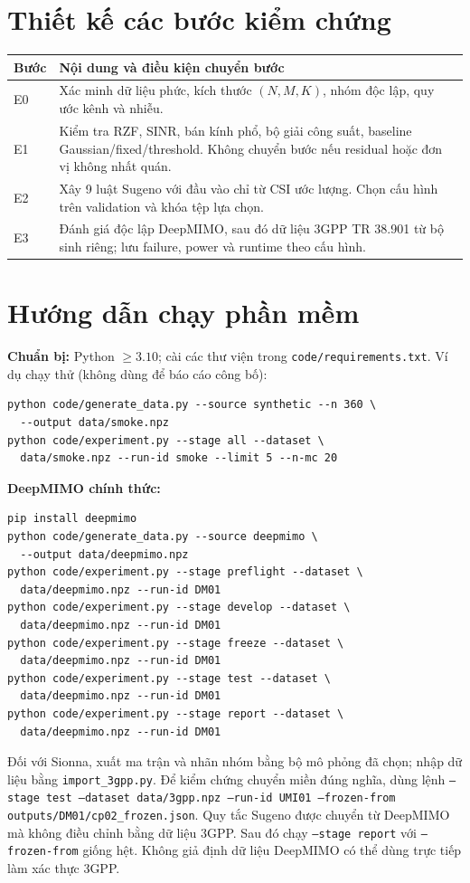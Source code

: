 \documentclass[11pt,onecolumn]{IEEEtran}
\begin{document}
\section{Thiết kế các bước kiểm chứng}
\begin{tabular}{p{.12\linewidth}p{.79\linewidth}}\toprule
Bước & Nội dung và điều kiện chuyển bước\\\midrule
E0 & Xác minh dữ liệu phức, kích thước $(N,M,K)$, nhóm độc lập, quy ước kênh và nhiễu.\\
E1 & Kiểm tra RZF, SINR, bán kính phổ, bộ giải công suất, baseline Gaussian/fixed/threshold. Không chuyển bước nếu residual hoặc đơn vị không nhất quán.\\
E2 & Xây 9 luật Sugeno với đầu vào chỉ từ CSI ước lượng. Chọn cấu hình trên validation và khóa tệp lựa chọn.\\
E3 & Đánh giá độc lập DeepMIMO, sau đó dữ liệu 3GPP TR 38.901 từ bộ sinh riêng; lưu failure, power và runtime theo cấu hình.\\\bottomrule\end{tabular}
\section{Hướng dẫn chạy phần mềm}
\textbf{Chuẩn bị:} Python $\geq3.10$; cài các thư viện trong \texttt{code/requirements.txt}. Ví dụ chạy thử (không dùng để báo cáo công bố):
\begin{verbatim}
python code/generate_data.py --source synthetic --n 360 \
  --output data/smoke.npz
python code/experiment.py --stage all --dataset \
  data/smoke.npz --run-id smoke --limit 5 --n-mc 20
\end{verbatim}
\textbf{DeepMIMO chính thức:}
\begin{verbatim}
pip install deepmimo
python code/generate_data.py --source deepmimo \
  --output data/deepmimo.npz
python code/experiment.py --stage preflight --dataset \
  data/deepmimo.npz --run-id DM01
python code/experiment.py --stage develop --dataset \
  data/deepmimo.npz --run-id DM01
python code/experiment.py --stage freeze --dataset \
  data/deepmimo.npz --run-id DM01
python code/experiment.py --stage test --dataset \
  data/deepmimo.npz --run-id DM01
python code/experiment.py --stage report --dataset \
  data/deepmimo.npz --run-id DM01
\end{verbatim}
Đối với Sionna, xuất ma trận và nhãn nhóm bằng bộ mô phỏng đã chọn; nhập dữ liệu bằng \texttt{import\_3gpp.py}. Để kiểm chứng chuyển miền đúng nghĩa, dùng lệnh \texttt{--stage test --dataset data/3gpp.npz --run-id UMI01 --frozen-from outputs/DM01/cp02\_frozen.json}. Quy tắc Sugeno được chuyển từ DeepMIMO mà không điều chỉnh bằng dữ liệu 3GPP. Sau đó chạy \texttt{--stage report} với \texttt{--frozen-from} giống hệt. Không giả định dữ liệu DeepMIMO có thể dùng trực tiếp làm xác thực 3GPP.
\end{document}

